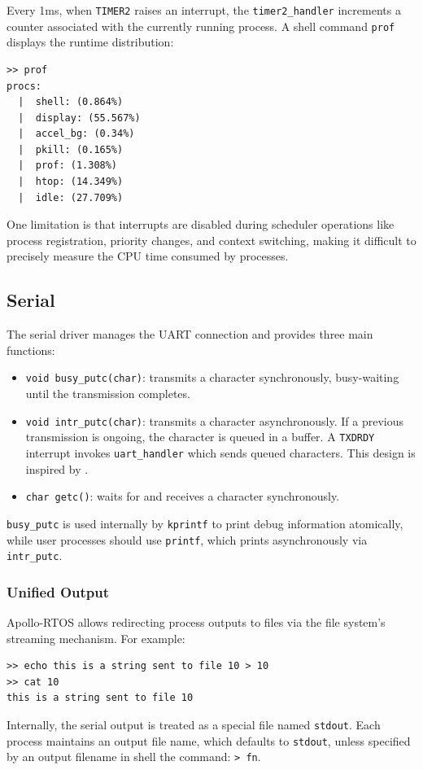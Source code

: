 Every 1ms, when \lstinline[style=myagc]|TIMER2| raises an interrupt, the
\lstinline[style=myagc]|timer2_handler| increments a counter associated with the
currently running process. A shell command \lstinline[style=mybash]|prof| displays the
runtime distribution:
\begin{lstlisting}[style=mytty]
>> prof
procs:
  |  shell: (0.864%)
  |  display: (55.567%)
  |  accel_bg: (0.34%)
  |  pkill: (0.165%)
  |  prof: (1.308%)
  |  htop: (14.349%)
  |  idle: (27.709%)
\end{lstlisting}

One limitation is that interrupts are disabled during scheduler operations like process
registration, priority changes, and context switching, making it difficult to precisely
measure the CPU time consumed by processes.

\subsection{Serial}

The serial driver manages the UART connection and provides three main functions:
\begin{itemize}
    \item \lstinline[style=myagc]|void busy_putc(char)|: transmits a character
        synchronously, busy-waiting until the transmission completes.
    \item \lstinline[style=myagc]|void intr_putc(char)|: transmits a character
        asynchronously. If a previous transmission is ongoing, the character is queued
        in a buffer. A \lstinline[style=myagc]|TXDRDY| interrupt invokes
        \lstinline[style=myagc]|uart_handler| which sends queued characters. This
        design is inspired by \citet{microbian}.
    \item \lstinline[style=myagc]|char getc()|: waits for and receives a character
        synchronously.
\end{itemize}

\lstinline[style=myagc]|busy_putc| is used internally by
\lstinline[style=myagc]|kprintf| to print debug information atomically, while user
processes should use \lstinline[style=myagc]|printf|, which prints asynchronously via
\lstinline[style=myagc]|intr_putc|.


\subsubsection{Unified Output} 

Apollo-RTOS allows redirecting process outputs to files via
the file system’s streaming mechanism. For example:
\begin{lstlisting}[style=mytty]
>> echo this is a string sent to file 10 > 10
>> cat 10
this is a string sent to file 10
\end{lstlisting}
Internally, the serial output is treated as a special file named
\lstinline[style=myagc]|stdout|. Each process maintains an output file name, which
defaults to \lstinline[style=myagc]|stdout|, unless specified by an output filename in
shell the command: \lstinline[style=mytty]|> fn|.

